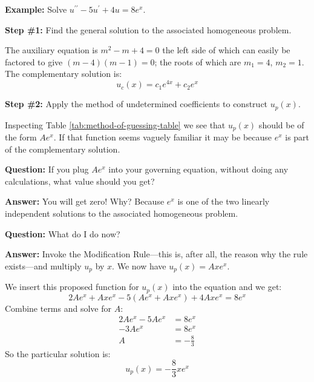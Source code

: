 \vspace{0.5cm}

\noindent\textbf{Example:} Solve $u^{\prime \prime}-5u^{\prime}+4u=8e^x$.

\vspace{0.25cm}

\noindent\textbf{Step \#1:} Find the general solution to the associated homogeneous problem.

\vspace{0.25cm}

\noindent The auxiliary equation is $m^2-m+4=0$ the left side of which can easily be factored to give $(m-4)(m-1)=0$; the roots of which are $m_1=4$, $m_2=1$.  The complementary solution is:
\begin{equation*}
u_c(x) = c_1e^{4x}+c_2e^{x}
\end{equation*} 

\noindent\textbf{Step \#2:} Apply the method of undetermined coefficients to construct $u_p(x)$.

\vspace{0.25cm}

\noindent Inspecting Table \ref{tab:method-of-guessing-table} we see that $u_p(x)$ should be of the form $Ae^{x}$.  If that function seems vaguely familiar it may be because $e^x$ is part of the complementary solution. 

\vspace{0.25cm}

\noindent\textbf{Question:} If you plug $Ae^{x}$ into your governing equation, without doing any calculations, what value should you get?

\vspace{0.25cm}

\noindent\textbf{Answer:} You will get zero!  Why? Because $e^{x}$ is one of the two linearly independent solutions to the associated homogeneous problem. 

\vspace{0.25cm}

\noindent\textbf{Question: } What do I do now?

\vspace{0.25cm}

\noindent\textbf{Answer: } Invoke the Modification Rule---this is, after all, the reason why the rule exists---and multiply $u_p$ by $x$.  We now have $u_p(x) = Axe^x$.

\vspace{0.25cm}

\noindent We insert this proposed function for $u_p(x)$ into the equation and we get:
\begin{equation*}
2Ae^x+Axe^x - 5(Ae^x+Axe^x) + 4Axe^x = 8e^x
\end{equation*} 
Combine terms and solve for $A$:
\begin{align*}
2Ae^x-5Ae^x &= 8e^x \\
-3Ae^x &= 8e^x \\
A &= -\frac{8}{3}
\end{align*}
So the particular solution is:
\begin{equation*}
u_p(x) = -\frac{8}{3}xe^x
\end{equation*}

